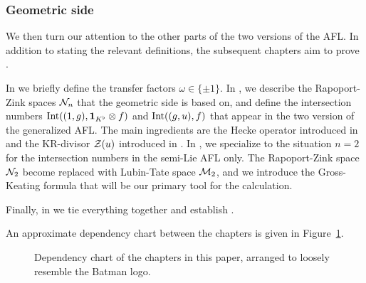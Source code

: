 \subsubsection{Geometric side}
We then turn our attention to the other parts of the two versions of the AFL.
In addition to stating the relevant definitions,
the subsequent chapters aim to prove .
\begin{itemize}
  \ii In  we briefly define the transfer factors $\omega \in \{\pm1\}$.
  \ii In , we describe the Rapoport-Zink spaces $\mathcal N_n$
  that the geometric side is based on, and define the intersection numbers
  $\operatorname{Int}((1,g), \mathbf{1}_{K^\flat} \otimes f)$ and $\operatorname{Int}((g,u), f)$
  that appear in the two version of the generalized AFL.
  The main ingredients are the Hecke operator introduced in \cite{ref:AFLspherical}
  and the KR-divisor $\mathcal Z(u)$ introduced in \cite{ref:KR}.
  \ii In , we specialize to the situation $n = 2$
  for the intersection numbers in the semi-Lie AFL only.
  The Rapoport-Zink space $\mathcal N_2$ become replaced with Lubin-Tate space $\mathcal M_2$,
  and we introduce the Gross-Keating formula
  that will be our primary tool for the calculation.
\end{itemize}
Finally, in  we tie everything together and establish
.

\ifthesis
An approximate dependency chart between the chapters is given in Figure~\ref{fig:depchart}.

\begin{figure}[ht]
  \begin{center}
  \end{center}
  \caption{Dependency chart of the chapters in this paper,
    arranged to loosely resemble the Batman logo.}
  \label{fig:depchart}
\end{figure}
\fi
